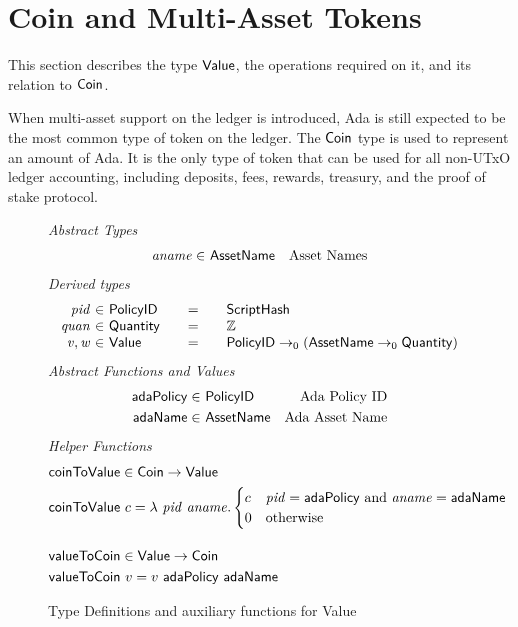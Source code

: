 \section{Coin and Multi-Asset Tokens}
\label{sec:coin-ma}

This section describes the type $\mathsf{Value}$, the operations required on
it, and its relation to $\mathsf{Coin}$.

When multi-asset support on the ledger is introduced, Ada is still expected to be
the most common type of token on the ledger.
The $\mathsf{Coin}$ type is used to represent an amount of Ada.
It is the only
type of token that can be used for all non-UTxO ledger accounting, including deposits,
fees, rewards, treasury, and the proof of stake protocol.

\begin{figure*}[t!]
  \emph{Abstract Types}
  \begin{align*}
    \mathit{aname} \in& ~\mathsf{AssetName} & \text{Asset Names}
  \end{align*}
  \emph{Derived types}
  \begin{equation*}
    \begin{array}{r@{~\in~}l@{\qquad=\qquad}lr}
      \var{pid} & \PolicyID & \ScriptHash \\
      \var{quan} & \Quantity & \Z \\
      \var{v}, \var{w} & \Value
      & \PolicyID \to_0 ( \AssetName \to_0 \Quantity )
    \end{array}
  \end{equation*}
  \emph{Abstract Functions and Values}
  \begin{align*}
    \mathsf{adaPolicy} \in& ~\mathsf{PolicyID} & \text{Ada Policy ID} \\
    \mathsf{adaName} \in& ~\mathsf{AssetName} & \text{Ada Asset Name} \\
  \end{align*}
  \emph{Helper Functions}
  \begin{align*}
    & \fun{coinToValue} \in \Coin\to \Value \\
    & \fun{coinToValue}~c = \lambda~\var{pid}~\var{aname}.
      \begin{cases}
        c & \var{pid} = \mathsf{adaPolicy}~\text{and}~\var{aname} = \mathsf{adaName} \\
        0 & \text{otherwise}
      \end{cases}
    \nextdef
    & \fun{valueToCoin} \in \Value \to \Coin \\
    & \fun{valueToCoin}~v = v~\mathsf{adaPolicy}~\mathsf{adaName}
  \end{align*}
  \caption{Type Definitions and auxiliary functions for Value}
  \label{fig:defs:value}
\end{figure*}

